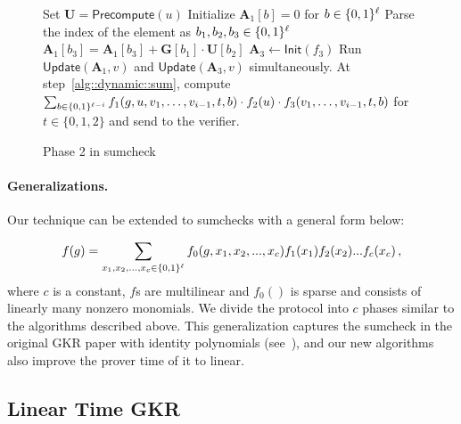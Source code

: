 \begin{figure}[t!]
	\begin{algorithm}[H]
		\caption{Phase 2 in sumcheck}\label{alg::phase2}
		\begin{algorithmic}[1]
			\State Set $\textbf{U} = \mathsf{Precompute}(u)$
			\State Initialize $\textbf{A}_1[b] = 0$ for $b\in\{0,1\}^\ell$
			\State Parse the index of the element as $b_1,b_2,b_3\in\{0,1\}^\ell$
			\State\label{alg::phase2::init} $\textbf{A}_1[b_3] = \textbf{A}_1[b_3]+ \textbf{G}[b_1]\cdot\textbf{U}[b_2]$
			\EndFor
			\EndProcedure
			\State $\textbf{A}_3\leftarrow\mathsf{Init}(f_3)$
			\State Run $\mathsf{Update}(\textbf{A}_1, v)$ and $\mathsf{Update}(\textbf{A}_3,v)$ simultaneously. At step~\ref{alg::dynamic::sum}, compute $\sum_{b\in\{0,1\}^{\ell-i}}f_1(g,u, v_1, \ldots,v_{i-1}, t, b)\cdot f_2(u)\cdot f_3(v_1, \ldots,v_{i-1}, t, b)$ for $t\in\{0,1,2\}$ and send to the verifier.
			\EndProcedure
		\end{algorithmic}
	\end{algorithm}
	
	\vspace{-.5in}
\end{figure}


\paragraph{Generalizations.}
Our technique can be extended to sumchecks with a general form below:

\[
f(g) = \sum\limits_{x_1, x_2, ..., x_c\in\{0,1\}^\ell}f_0(g,x_1, x_2, ..., x_c)f_1(x_1)f_2(x_2)...f_c(x_c)\, ,
\]
where $c$ is a constant, $f$s are multilinear and $f_0()$ is sparse and consists of linearly many nonzero monomials. We divide the protocol into $c$ phases similar to the algorithms described above. This generalization captures the sumcheck in the original GKR paper with identity polynomials (see~\cite{GKR}), and our new algorithms also improve the prover time of it to linear.

\subsection{Linear Time GKR}

